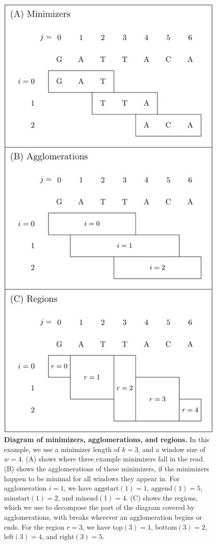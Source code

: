 \documentclass[11pt]{ucscthesis}
\newcommand{\rtop}[1]{\mathrm{top}(#1)}
\newcommand{\rbottom}[1]{\mathrm{bottom}(#1)}
\newcommand{\rleft}[1]{\mathrm{left}(#1)}
\newcommand{\rright}[1]{\mathrm{right}(#1)}
\newcommand{\minstart}[1]{\mathrm{minstart}(#1)}
\newcommand{\minend}[1]{\mathrm{minend}(#1)}
\newcommand{\aggstart}[1]{\mathrm{aggstart}(#1)}
\newcommand{\aggend}[1]{\mathrm{aggend}(#1)}
\begin{document}
\begin{figure}[p]
    \includegraphics[width=.5\linewidth]{aim2_supplement_regiondiagram.pdf}
    \caption[Diagram of minimizers, agglomerations, and regions]{{\bf Diagram of minimizers, agglomerations, and regions.} In this example, we use a minimizer length of $k=3$, and a window size of $w=4$. (A) shows where three example minimizers fall in the read. (B) shows the agglomerations of these minimizers, if the minimizers happen to be minimal for all windows they appear in. For agglomeration $i=1$, we have $\aggstart{1}=1$, $\aggend{1}=5$, $\minstart{1}=2$, and $\minend{1}=4$. (C) shows the regions, which we use to decompose the part of the diagram covered by agglomerations, with breaks wherever an agglomeration begins or ends. For the region $r=3$, we have $\rtop{3}=1$, $\rbottom{3}=2$, $\rleft{3}=4$, and $\rright{3}=5$.
  }
  \label{fig:aim2_supplement_regions}
\end{figure}
\end{document}
